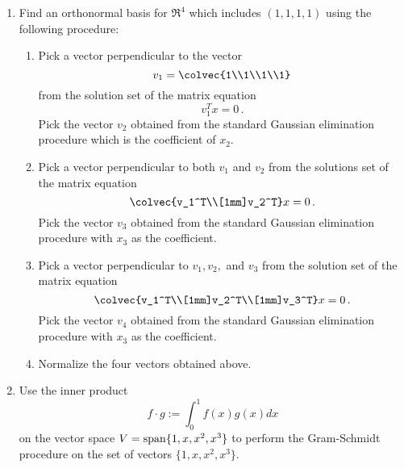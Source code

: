 \begin{enumerate}




\item Find an orthonormal  basis for $\Re^4$ which includes $(1,1,1,1)$ using the following procedure:\\
\begin{enumerate} 
\item Pick a vector perpendicular to the vector 
\[v_1 =\colvec{1\\1\\1\\1}\] from the solution set of the matrix equation \[v_1^Tx=0\, .\] Pick the vector $v_2$ obtained from the standard Gaussian elimination procedure which is the coefficient of $x_2$.
\item Pick a vector perpendicular to both $v_1$ and $v_2$ from the solutions set of the matrix equation \[\colvec{v_1^T\\[1mm]v_2^T}x=0\, .\] Pick the vector $v_3$ obtained from the standard Gaussian elimination procedure with $x_3$ as the coefficient. 
\item Pick a vector perpendicular to $v_1,v_2,$ and $v_3$ from the solution set of the matrix equation \[\colvec{v_1^T\\[1mm]v_2^T\\[1mm]v_3^T}x=0\, .\]  Pick the vector $v_4$ obtained from the standard Gaussian elimination procedure with $x_3$ as the coefficient. 
\item Normalize the four vectors obtained   above.
\end{enumerate}


\item Use the inner product \[f\cdot g := \int_0^1 f(x)g(x)dx\]  on the vector space $V={\rm span} \{1,x,x^2,x^3\}$ to perform the Gram-Schmidt procedure on the set of vectors $\{1,x,x^2,x^3\}$. 


\end{enumerate}
